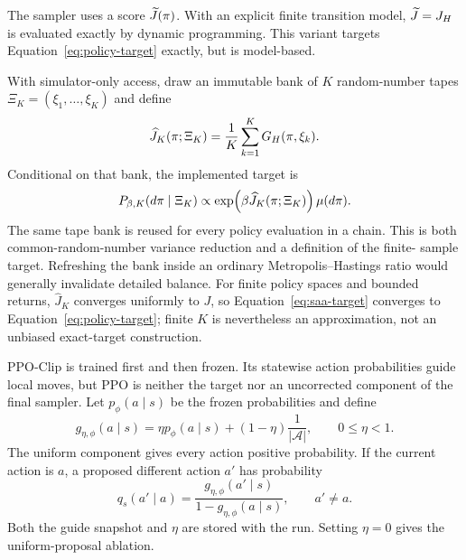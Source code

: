 \label{sec:corrected-method}




The sampler uses a score \(\widetilde J(\pi)\).  With an explicit finite
transition model, \(\widetilde J=J_H\) is evaluated exactly by
dynamic programming.  This variant targets Equation~\eqref{eq:policy-target}
exactly, but is model-based.

With simulator-only access, draw an immutable bank of \(K\) random-number
tapes \(\Xi_K=(\xi_1,\ldots,\xi_K)\) and define
\begin{equation}
  \widehat J_K(\pi;\Xi_K)
  = \frac{1}{K}\sum_{k=1}^{K}G_H(\pi,\xi_k).
  \label{eq:saa-return}
\end{equation}
Conditional on that bank, the implemented target is
\begin{equation}
  P_{\beta,K}(d\pi\mid\Xi_K)
  \propto
  \exp\!\left(\beta\widehat J_K(\pi;\Xi_K)\right)\mu(d\pi).
  \label{eq:saa-target}
\end{equation}
The same tape bank is reused for every policy evaluation in a chain.  This is
both common-random-number variance reduction and a definition of the finite-
sample target.  Refreshing the bank inside an ordinary Metropolis--Hastings
ratio would generally invalidate detailed balance.  For finite policy spaces
and bounded returns, \(\widehat J_K\) converges uniformly to \(J\), so
Equation~\eqref{eq:saa-target} converges to
Equation~\eqref{eq:policy-target}; finite \(K\) is nevertheless an
approximation, not an unbiased exact-target construction.


PPO-Clip \citep{schulman2017} is trained first and then frozen.  Its statewise
action probabilities guide local moves, but PPO is neither the target nor an
uncorrected component of the final sampler.  Let
\(p_\phi(a\mid s)\) be the frozen probabilities and define
\begin{equation}
  g_{\eta,\phi}(a\mid s)
  = \eta p_\phi(a\mid s)
    +(1-\eta)\frac{1}{|\mathcal A|},
  \qquad 0\leq\eta<1.
  \label{eq:mh-guide}
\end{equation}
The uniform component gives every action positive probability.  If the current
action is \(a\), a proposed different action \(a'\) has probability
\begin{equation}
  q_s(a'\mid a)
  = \frac{g_{\eta,\phi}(a'\mid s)}
         {1-g_{\eta,\phi}(a\mid s)},
  \qquad a'\neq a.
  \label{eq:forced-different-proposal}
\end{equation}
Both the guide snapshot and \(\eta\) are stored with the run.  Setting
\(\eta=0\) gives the uniform-proposal ablation.

